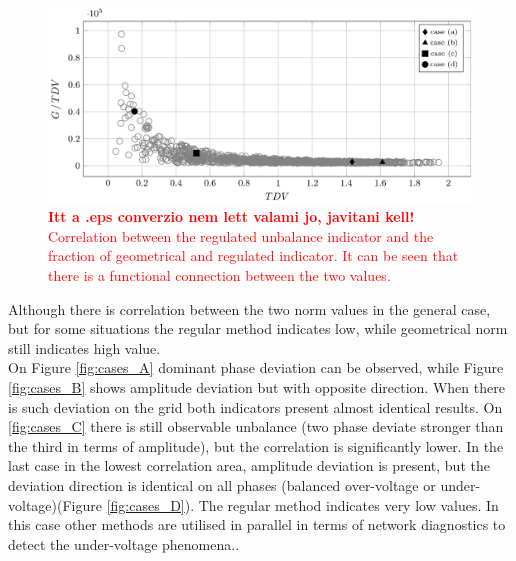            \begin{figure}[!ht]
           \centering
           \includegraphics[width=\textwidth,scale=0.95]{Unblance_EPS_Pics/EPS_images/side_scatter.eps}
           \caption{\textcolor{red}{\textbf{Itt a .eps converzio nem lett valami jo, javitani kell!} Correlation between the regulated unbalance indicator and the fraction of geometrical and regulated indicator. It can be seen that there is a functional connection between the two values.}}
           \label{fig:side_correlation}
            \end{figure}


            Although there is correlation between the two norm values in the general case, but for some situations the regular method indicates low, while geometrical norm still indicates high value.\\
            On Figure \ref{fig:cases_A} dominant phase deviation can be observed, while Figure \ref{fig:cases_B} shows amplitude deviation but with opposite direction. When there is such deviation on the grid both indicators present almost identical results. On \ref{fig:cases_C} there is still observable unbalance (two phase deviate stronger than the third in terms of amplitude), but the correlation is significantly lower. In the last case in the lowest correlation area, amplitude deviation is present, but the deviation direction is identical on all phases (balanced over-voltage or under-voltage)(Figure \ref{fig:cases_D}). The regular method indicates very low values. In this case other methods are utilised in parallel in terms of network diagnostics to detect the under-voltage phenomena.\cite{arn1997under-voltage}.


